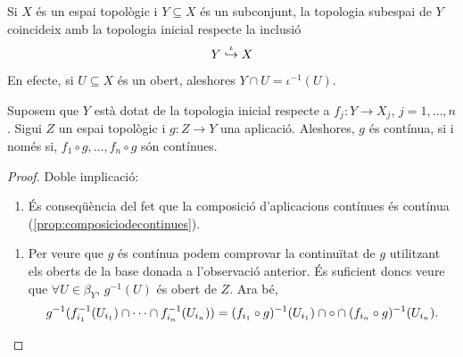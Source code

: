 \documentclass[../main.tex]{subfiles}
\begin{document}
\begin{ej}
\label{ej:topoinicialinclusio} Si $X$ és un espai topològic i $Y\subseteq X$ és un subconjunt, la topologia subespai de $Y$ coincideix amb la topologia inicial respecte la inclusió
\begin{equation}
    \notag
    Y\overset{\iota}{\hookrightarrow} X
\end{equation}
En efecte, si $U\subseteq X$ és un obert, aleshores $Y\cap U = \iota^{-1}(U)$.
\end{ej}

\begin{prop}
\label{prop:composiciotopoinicial} Suposem que $Y$ està dotat de la topologia inicial respecte a $f_j:Y\rightarrow X_j$, $j = 1,\ldots,n$. Sigui $Z$ un espai topològic i $g:Z\rightarrow Y$ una aplicació. Aleshores, $g$ és contínua, si i només si, $f_1\circ g,\ldots, f_n\circ g$ són contínues.
\end{prop}
\begin{proof}
Doble implicació:
\begin{enumerate}[($\Rightarrow$)]
    \item És conseqüència del fet que la composició d'aplicacions contínues és contínua (\ref{prop:composiciodecontinues}).
\end{enumerate}
\begin{enumerate}[($\Leftarrow$)]
    \item Per veure que $g$ és contínua podem comprovar la continuïtat de $g$ utilitzant els oberts de la base donada a l'observació anterior. És suficient doncs veure que $\forall U\in \beta_Y$, $g^{-1}(U)$ és obert de $Z$. Ara bé,
    \begin{equation}
        \notag
        g^{-1}(f_{i_1}^{-1}(U_{i_1})\cap \cdots\cap f_{i_n}^{-1}(U_{i_n})) = (f_{i_1}\circ g)^{-1}(U_{i_1})\cap\circ\cap(f_{i_n}\circ g)^{-1}(U_{i_n}).
    \end{equation}
\end{enumerate}
\end{proof}
\end{document}
